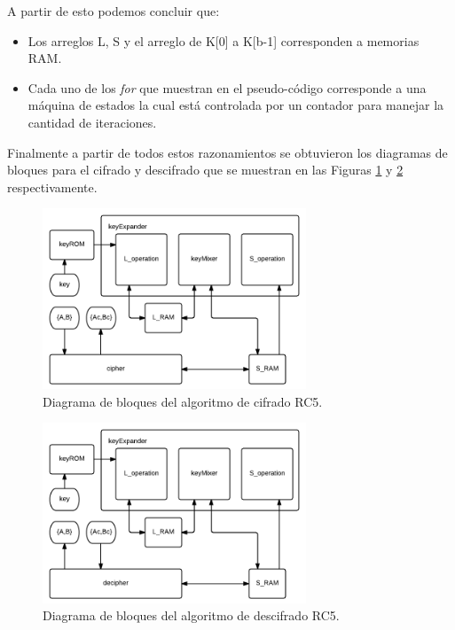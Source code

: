 A partir de esto podemos concluir que:
\begin{itemize}
\item Los arreglos L, S y el arreglo de K[0] a K[b-1] corresponden a memorias RAM.
\item Cada uno de los \textit{for} que muestran en el pseudo-código corresponde a una máquina de estados la cual está controlada por un contador para manejar la cantidad de iteraciones.
\end{itemize}
Finalmente a partir de todos estos razonamientos se obtuvieron los diagramas de bloques para el cifrado y descifrado que se muestran en las Figuras \ref{figCipherBlockDiagram} y \ref{figDecipherBlockDiagram} respectivamente.

\begin{figure}
	\centering
	\includegraphics[width=0.7\textwidth]{./images/figCipherBlockDiagram}
	\caption{Diagrama de bloques del algoritmo de cifrado RC5.}
	\label{figCipherBlockDiagram}
\end{figure}
\begin{figure}
	\centering
	\includegraphics[width=0.7\textwidth]{./images/figDecipherBlockDiagram}
	\caption{Diagrama de bloques del algoritmo de descifrado RC5.}
	\label{figDecipherBlockDiagram}
\end{figure}


